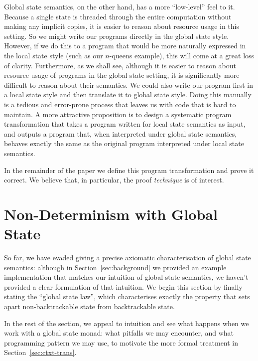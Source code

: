 \documentclass{llncs}
\begin{document}
Global state semantics, on the other hand, has a more ``low-level'' feel to it.
Because a single state is threaded through the entire computation without
making any implicit copies, it is easier to reason about resource usage in this
setting. So we might write our programs directly in the global state style.
However, if we do this to a program that would be more naturally expressed in
the local state style (such as our $n$-queens example), this will come at a
great loss of clarity. Furthermore, as we shall see, although it is easier to
reason about resource usage of programs in the global state setting, it is
significantly more difficult to reason about their semantics. We could also
write our program first in a local state style and then translate it to global
state style. Doing this manually is a tedious and error-prone process that
leaves us with code that is hard to maintain. A more attractive proposition is
to design a systematic program transformation that takes a program written for
local state semantics as input, and outputs a program that, when interpreted
under global state semantics, behaves exactly the same as the original program
interpreted under local state semantics.

In the remainder of the paper we define this program transformation and prove it
correct. We believe that, in particular, the proof \emph{technique} is of interest.

\section{Non-Determinism with Global State}
\label{sec:nd-state-global}
So far, we have evaded giving a precise axiomatic characterisation of global
state semantics: although in Section~\ref{sec:background} we provided an example
implementation that matches our intuition of global state semantics, we haven't
provided a clear formulation of that intuition. We begin this section by finally
stating the ``global state law'', which characterises exactly the property that
sets apart non-backtrackable state from backtrackable state.

In the rest of the section, we appeal to intuition and see what happens when we
work with a global state monad: what pitfalls we may encounter, and what
programming pattern we may use, to motivate the more formal treatment in
Section~\ref{sec:ctxt-trans}.
\end{document}
